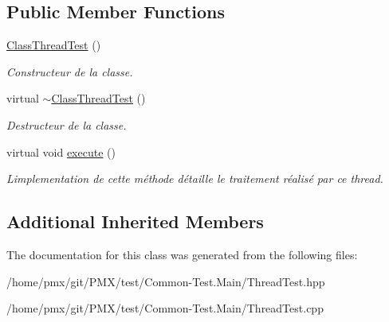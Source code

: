 \subsection*{Public Member Functions}
\begin{DoxyCompactItemize}
\item 
\mbox{\label{classtest_1_1ClassThreadTest_a040b11185d89fbd1a6cb7b43a7b03991}} 
\hyperlink{classtest_1_1ClassThreadTest_a040b11185d89fbd1a6cb7b43a7b03991}{Class\+Thread\+Test} ()
\begin{DoxyCompactList}\small\item\em Constructeur de la classe. \end{DoxyCompactList}\item 
\mbox{\label{classtest_1_1ClassThreadTest_ace771a311abeb871f8b03265b5202ab3}} 
virtual \hyperlink{classtest_1_1ClassThreadTest_ace771a311abeb871f8b03265b5202ab3}{$\sim$\+Class\+Thread\+Test} ()
\begin{DoxyCompactList}\small\item\em Destructeur de la classe. \end{DoxyCompactList}\item 
\mbox{\label{classtest_1_1ClassThreadTest_a2f00b13755976f58db342731d54ae939}} 
virtual void \hyperlink{classtest_1_1ClassThreadTest_a2f00b13755976f58db342731d54ae939}{execute} ()
\begin{DoxyCompactList}\small\item\em L\textquotesingle{}implementation de cette méthode détaille le traitement réalisé par ce thread. \end{DoxyCompactList}\end{DoxyCompactItemize}
\subsection*{Additional Inherited Members}


The documentation for this class was generated from the following files\+:\begin{DoxyCompactItemize}
\item 
/home/pmx/git/\+P\+M\+X/test/\+Common-\/\+Test.\+Main/Thread\+Test.\+hpp\item 
/home/pmx/git/\+P\+M\+X/test/\+Common-\/\+Test.\+Main/Thread\+Test.\+cpp\end{DoxyCompactItemize}
